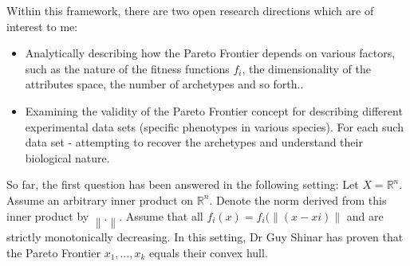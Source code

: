 \documentclass{article}
\theoremstyle{definition}
\theoremstyle{remark}
\def \norm [#1]{\left\| #1 \right\|}
\begin{document}
Within this framework, there are two open research directions which are of interest to me:
\begin{itemize} 
\item Analytically describing how the Pareto Frontier depends on various factors, such as the nature of the fitness functions $f_i$, 
the dimensionality of the attributes space,  the number of archetypes and so forth..
\item Examining the validity of the Pareto Frontier concept for describing different experimental data sets (specific phenotypes in various species). 
For each such data set - attempting to recover the archetypes and understand their biological nature.
\end{itemize}

So far, the first question has been answered in the following setting: 
Let $X = \mathbb{R}^n$. Assume an arbitrary inner product on $\mathbb{R}^n$. 
Denote the norm derived from this inner product by $\norm[.]$. 
Assume that all $f_i(x) = f_i(\norm[(x-xi)]$ and are strictly monotonically decreasing. 
In this setting, Dr Guy Shinar has proven that the Pareto Frontier $x_1,\ldots,x_k$ equals their convex hull.
\end{document}
